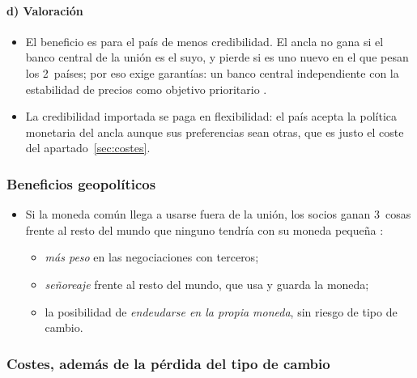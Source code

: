\documentclass[11pt]{article}
\begin{document}
\paragraph{d) Valoración}

\begin{itemize}
\item El beneficio es para el país de menos credibilidad. El ancla no gana si el banco central de la unión es el suyo, y pierde si es uno nuevo en el que pesan los 2~países; por eso exige garantías: un banco central independiente con la estabilidad de precios como objetivo prioritario\nocite{DeGrauwe2022Economics} .
\item La credibilidad importada se paga en flexibilidad: el país acepta la política monetaria del ancla aunque sus preferencias sean otras, que es justo el coste del apartado~\ref{sec:costes}.
\end{itemize}

\subsubsection{Beneficios geopolíticos}\label{sec:beneficios-geo}

\begin{itemize}
\item Si la moneda común llega a usarse fuera de la unión, los socios ganan 3~cosas frente al resto del mundo que ninguno tendría con su moneda pequeña :
  \begin{itemize}
  \item \emph{más peso} en las negociaciones con terceros;
  \item \emph{señoreaje} frente al resto del mundo, que usa y guarda la moneda;
  \item la posibilidad de \emph{endeudarse en la propia moneda}, sin riesgo de tipo de cambio.
  \end{itemize}
\end{itemize}

\subsubsection{Costes, además de la pérdida del tipo de cambio}\label{sec:costes-adicionales}
\end{document}
